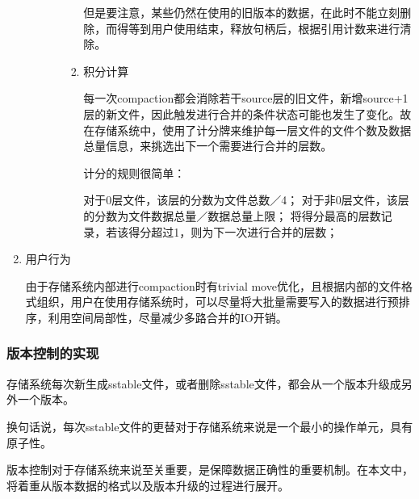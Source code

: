 \begin{enumerate}
\begin{enumerate}
\begin{enumerate}
\begin{enumerate}
	但是要注意，某些仍然在使用的旧版本的数据，在此时不能立刻删除，而得等到用户使用结束，释放句柄后，根据引用计数来进行清除。
	
	\item 积分计算
	
	每一次compaction都会消除若干source层的旧文件，新增source+1层的新文件，因此触发进行合并的条件状态可能也发生了变化。故在存储系统中，使用了计分牌来维护每一层文件的文件个数及数据总量信息，来挑选出下一个需要进行合并的层数。
	
	计分的规则很简单：
	
	对于0层文件，该层的分数为文件总数／4；
	对于非0层文件，该层的分数为文件数据总量／数据总量上限；
	将得分最高的层数记录，若该得分超过1，则为下一次进行合并的层数；
				\end{enumerate}
				
				\end{enumerate}
				
				
				
			\end{enumerate}

			\item 用户行为
			
			由于存储系统内部进行compaction时有trivial move优化，且根据内部的文件格式组织，用户在使用存储系统时，可以尽量将大批量需要写入的数据进行预排序，利用空间局部性，尽量减少多路合并的IO开销。

		\end{enumerate}
		


		\subsubsection{版本控制的实现}

		存储系统每次新生成sstable文件，或者删除sstable文件，都会从一个版本升级成另外一个版本。

			换句话说，每次sstable文件的更替对于存储系统来说是一个最小的操作单元，具有原子性。

			版本控制对于存储系统来说至关重要，是保障数据正确性的重要机制。在本文中，将着重从版本数据的格式以及版本升级的过程进行展开。

